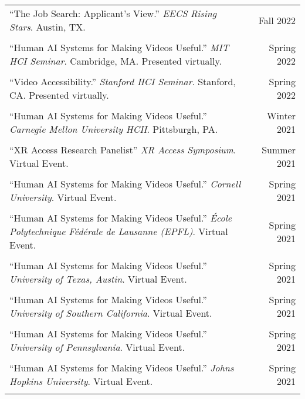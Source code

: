 \begin{longtable}{Xr}
	``The Job Search: Applicant's View.'' \textit{EECS Rising Stars}. Austin, TX. & Fall 2022 \\
	\\

	``Human AI Systems for Making Videos Useful.'' \textit{MIT HCI Seminar}. Cambridge, MA. Presented virtually. & Spring 2022 \\
	\\

	``Video Accessibility.'' \textit{Stanford HCI Seminar}. Stanford, CA. Presented virtually. & Spring 2022 \\
	\\

	``Human AI Systems for Making Videos Useful.'' \textit{Carnegie Mellon University HCII}. Pittsburgh, PA. & Winter 2021 \\
	\\

	``XR Access Research Panelist'' \textit{XR Access Symposium}. Virtual Event. & Summer 2021 \\
	\\

	``Human AI Systems for Making Videos Useful.'' \textit{Cornell University}. Virtual Event. & Spring 2021 \\
	\\

	``Human AI Systems for Making Videos Useful.'' \textit{École Polytechnique Fédérale de Lausanne (EPFL)}. Virtual Event. & Spring 2021 \\
	\\

	``Human AI Systems for Making Videos Useful.'' \textit{University of Texas, Austin}. Virtual Event. & Spring 2021 \\
	\\

	``Human AI Systems for Making Videos Useful.'' \textit{University of Southern California}. Virtual Event. & Spring 2021 \\
	\\

	``Human AI Systems for Making Videos Useful.'' \textit{University of Pennsylvania}. Virtual Event. & Spring 2021 \\
	\\

	``Human AI Systems for Making Videos Useful.'' \textit{Johns Hopkins University}. Virtual Event. & Spring 2021 \\
	\\


\end{longtable}
